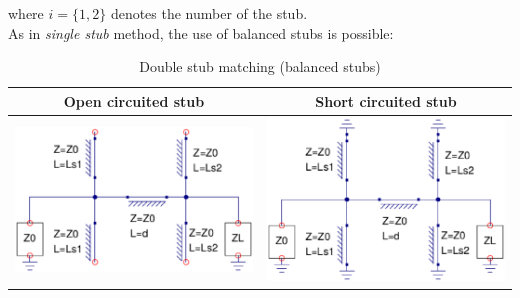 \noindent where $i=\lbrace 1,2 \rbrace$ denotes the number of the stub.\\

\noindent As in \textit{single stub} method, the use of balanced stubs is possible:

\begin{table}[H]
  \centering
  \begin{tabular}{ | c | c | }
    \hline
    Open circuited stub & Short circuited stub\\ \hline
    \begin{minipage}{.4\textwidth}
      \includegraphics[width=\linewidth]{DoubleStubOpenBalanced}
    \end{minipage}
    &
    \begin{minipage}{.4\textwidth}
      \includegraphics[width=\linewidth]{DoubleStubShortBalanced}
    \end{minipage}
    \\ \hline
  \end{tabular}
  \caption{Double stub matching (balanced stubs)}\label{tbl:dblstubbalanced}
\end{table}

